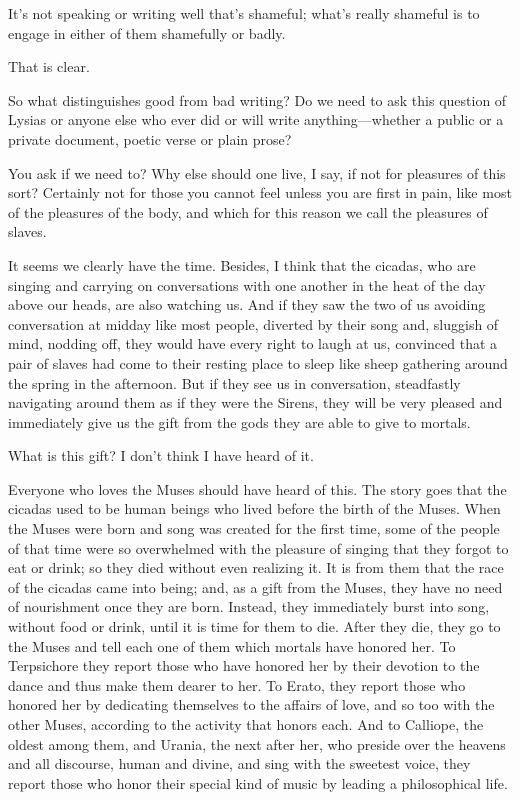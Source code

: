 \saysocrates It's not speaking or writing well that's shameful; what's
really shameful is to engage in either of them shamefully or badly.

\sayphaedrus That is clear.

\saysocrates So what distinguishes good from bad writing? Do we need to ask
this question of Lysias or anyone else who ever did or will write
anything---whether a public or a private document, poetic verse or plain
prose?

\sayphaedrus You ask if we need to? Why else should one live, I say, if 
not for pleasures of this sort? Certainly not for those you
cannot feel unless you are first in pain, like most of the pleasures of
the body, and which for this reason we call the pleasures of slaves.

\saysocrates It seems we clearly have the time. Besides, I think that the
cicadas, who are singing and carrying on conversations with one another 
in the heat of the day above our heads, are also
watching us. And if they saw the two of us avoiding conversation at
midday like most people, diverted by their song and, sluggish of mind,
nodding off, they would have every right to laugh at us, convinced that
a pair of slaves had come to their resting place to sleep like sheep
gathering around the spring in the afternoon. But if they see us in
conversation, steadfastly navigating around them as if they were
the Sirens, they will be very pleased and immediately give us the gift
from the gods they are able to give to mortals.

\sayphaedrus What is this gift? I don't think I have heard of it.

\saysocrates Everyone who loves the Muses should have heard of this. The
story goes that the cicadas used to be human beings who lived before the
birth of the Muses. When the Muses were born and song was created for
the first time, some of the people of that time were so overwhelmed 
with the pleasure of singing that they forgot to eat or drink;
so they died without even realizing it. It is from them that the race of
the cicadas came into being; and, as a gift from the Muses, they have no
need of nourishment once they are born. Instead, they immediately burst
into song, without food or drink, until it is time for them to die.
After they die, they go to the Muses and tell each one of them which
mortals have honored her. To Terpsichore they report those who
have honored her by their devotion to the dance and thus make them
dearer to her. To Erato, they report those who honored her by dedicating
themselves to the affairs of love, and so too with the other Muses,
according to the activity that honors each. And to Calliope, the oldest
among them, and Urania, the next after her, who preside over the heavens
and all discourse, human and divine, and sing with the sweetest voice,
they report those who honor their special kind of music by leading a
philosophical life.

